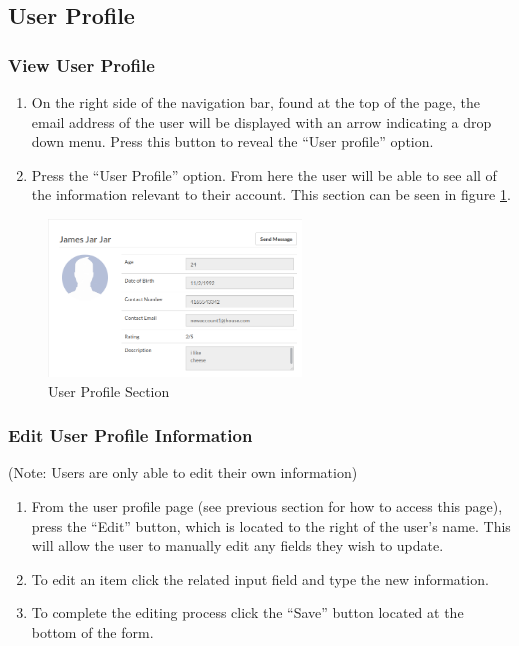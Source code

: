 \documentclass[12pt]{article}
\begin{document}
    \subsection{User Profile} %
    \subsubsection{View User Profile}
    \begin{enumerate}
        \item On the right side of the navigation bar, found at the top of the page, the email address of the user will be displayed with an arrow indicating a drop down menu. Press this button to reveal the ``User profile'' option.
        \item Press the ``User Profile'' option. From here the user will be able to see all of the information relevant to their account. This section can be seen in figure \ref{fig:user_profile}.
    \end{enumerate}

    \begin{figure}
        \centering
        \includegraphics[width=0.6\textwidth]{user_profile}
        \caption{User Profile Section}
        \label{fig:user_profile}
    \end{figure}

    \subsubsection{Edit User Profile Information}
    (Note: Users are only able to edit their own information)
    \begin{enumerate}
        \item From the user profile page (see previous section for how to access this page), press the ``Edit'' button, which is located to the right of the user's name. This will allow the user to manually edit any fields they wish to update.
        \item To edit an item click the related input field and type the new information.
        \item To complete the editing process click the ``Save'' button located at the bottom of the form.
    \end{enumerate}
\end{document}
